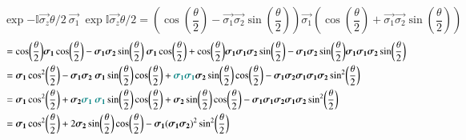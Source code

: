 $$ 	\exp{ -\mathbb{I} \vec{\sigma_z} \theta / 2} \ \vec{\sigma_1}  \
\exp{ \mathbb{I} \vec{\sigma_z} \theta / 2}  = \left(  \cos(\frac{\theta}{2}) - \vec{\sigma_1} \vec{\sigma_2} \sin(\frac{\theta}{2}) \right) \vec{\sigma_1} \left(  \cos(\frac{\theta}{2}) + \vec  {\sigma_1} \vec{\sigma_2} \sin(\frac{\theta}{2}) \right) $$
\begin{align*} 
                                                 &=   \cos(\frac{\theta}{2}) \vec{\sigma_1} \cos(\frac{\theta}{2}) 
                                                  - \vec{\sigma_1} \vec{\sigma_2} \sin(\frac{\theta}{2})  \ \vec{\sigma_1} \cos(\frac{\theta}{2})
                                                  + \cos(\frac{\theta}{2}) \vec{\sigma_1}  \vec{\sigma_1} \vec{\sigma_2} \sin(\frac{\theta}{2}) 
                                                  -  \vec  {\sigma_1} \vec{\sigma_2} \sin(\frac{\theta}{2}) \vec{\sigma_1}  \vec{\sigma_1} \vec{\sigma_2} \sin(\frac{\theta}{2}) \\
                                                 &=  \vec{\sigma_1}   \cos[2](\frac{\theta}{2}) 
                                                  - \vec{\sigma_1} \vec{\sigma_2}  \ \vec{\sigma_1} \sin(\frac{\theta}{2})  \cos(\frac{\theta}{2}) 
                                                  + \color{teal} \vec{\sigma_1}  \vec{\sigma_1}  \color{black} \vec{\sigma_2} \sin(\frac{\theta}{2})  \cos(\frac{\theta}{2})
                                                  -  \vec  {\sigma_1} \vec{\sigma_2} \vec{\sigma_1} \vec{\sigma_1} \vec{\sigma_2}    \sin[2](\frac{\theta}{2}) \\
                                                 &=  \vec{\sigma_1}   \cos[2](\frac{\theta}{2}) 
                                                  + \vec{\sigma_2} \color{teal} \vec{\sigma_1}  \ \vec{\sigma_1} \color{black} \sin(\frac{\theta}{2})  \cos(\frac{\theta}{2})
                                                  + \vec{\sigma_2} \sin(\frac{\theta}{2})  \cos(\frac{\theta}{2})
                                                  -  \vec  {\sigma_1} \vec{\sigma_1} \vec{\sigma_2} \vec{\sigma_1} \vec{\sigma_2}    \sin[2](\frac{\theta}{2}) \\
                                                 &=  \vec{\sigma_1}   \cos[2](\frac{\theta}{2}) 
                                                 + 2 \vec{\sigma_2} \sin(\frac{\theta}{2})  \cos(\frac{\theta}{2})
                                                 - \vec{\sigma_1}  (\vec  {\sigma_1} \vec{\sigma_2} )^2    \sin[2](\frac{\theta}{2})
\end{align*}
